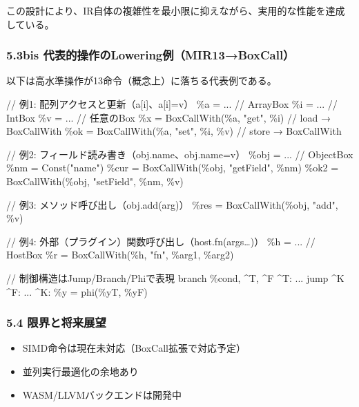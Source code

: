 \documentclass[
]{article}
\newenvironment{Shaded}{}{}
\newcommand{\NormalTok}[1]{#1}
\providecommand{\tightlist}{%
  \setlength{\itemsep}{0pt}\setlength{\parskip}{0pt}}
\begin{document}
この設計により、IR自体の複雑性を最小限に抑えながら、実用的な性能を達成している。

\hypertarget{bis-ux4ee3ux8868ux7684ux64cdux4f5cux306eloweringux4f8bmir13boxcall}{%
\subsubsection{5.3bis
代表的操作のLowering例（MIR13→BoxCall）}\label{bis-ux4ee3ux8868ux7684ux64cdux4f5cux306eloweringux4f8bmir13boxcall}}

以下は高水準操作が13命令（概念上）に落ちる代表例である。

\begin{Shaded}
\begin{Highlighting}[]
\NormalTok{// 例1: 配列アクセスと更新（a[i]、a[i]=v）}
\NormalTok{\%a   = ...                 // ArrayBox}
\NormalTok{\%i   = ...                 // IntBox}
\NormalTok{\%v   = ...                 // 任意のBox}
\NormalTok{\%x   = BoxCallWith(\%a, "get", \%i)           // load → BoxCallWith}
\NormalTok{\%ok  = BoxCallWith(\%a, "set", \%i, \%v)       // store → BoxCallWith}

\NormalTok{// 例2: フィールド読み書き（obj.name、obj.name=v）}
\NormalTok{\%obj = ...                 // ObjectBox}
\NormalTok{\%nm  = Const("name")}
\NormalTok{\%cur = BoxCallWith(\%obj, "getField", \%nm)}
\NormalTok{\%ok2 = BoxCallWith(\%obj, "setField", \%nm, \%v)}

\NormalTok{// 例3: メソッド呼び出し（obj.add(arg)）}
\NormalTok{\%res = BoxCallWith(\%obj, "add", \%v)}

\NormalTok{// 例4: 外部（プラグイン）関数呼び出し（host.fn(args…)）}
\NormalTok{\%h   = ...                 // HostBox}
\NormalTok{\%r   = BoxCallWith(\%h, "fn", \%arg1, \%arg2)}

\NormalTok{// 制御構造はJump/Branch/Phiで表現}
\NormalTok{branch \%cond, \^{}T, \^{}F}
\NormalTok{\^{}T:  ...}
\NormalTok{     jump \^{}K}
\NormalTok{\^{}F:  ...}
\NormalTok{\^{}K:  \%y = phi(\%yT, \%yF)}
\end{Highlighting}
\end{Shaded}

\hypertarget{ux9650ux754cux3068ux5c06ux6765ux5c55ux671b}{%
\subsubsection{5.4
限界と将来展望}\label{ux9650ux754cux3068ux5c06ux6765ux5c55ux671b}}

\begin{itemize}
\tightlist
\item
  SIMD命令は現在未対応（BoxCall拡張で対応予定）
\item
  並列実行最適化の余地あり
\item
  WASM/LLVMバックエンドは開発中
\end{itemize}
\end{document}
